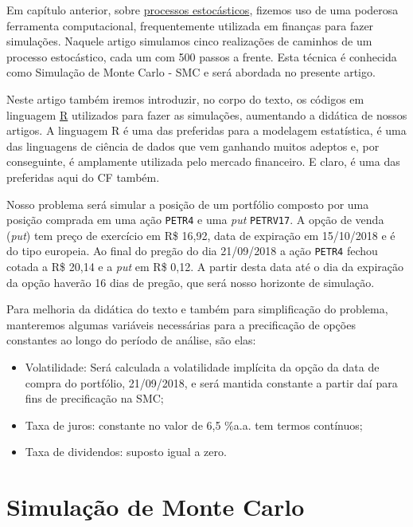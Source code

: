 \documentclass[]{book}
\theoremstyle{definition}
\theoremstyle{definition}
\theoremstyle{definition}
\theoremstyle{remark}
\begin{document}
Em capítulo anterior, sobre
\protect\hyperlink{processos-estocasticos}{processos estocásticos},
fizemos uso de uma poderosa ferramenta computacional, frequentemente
utilizada em finanças para fazer simulações. Naquele artigo simulamos
cinco realizações de caminhos de um processo estocástico, cada um com
500 passos a frente. Esta técnica é conhecida como Simulação de Monte
Carlo - SMC e será abordada no presente artigo.

Neste artigo também iremos introduzir, no corpo do texto, os códigos em
linguagem \href{https://cran.r-project.org/}{R} utilizados para fazer as
simulações, aumentando a didática de nossos artigos. A linguagem R é uma
das preferidas para a modelagem estatística, é uma das linguagens de
ciência de dados que vem ganhando muitos adeptos e, por conseguinte, é
amplamente utilizada pelo mercado financeiro. E claro, é uma das
preferidas aqui do CF também.

Nosso problema será simular a posição de um portfólio composto por uma
posição comprada em uma ação \texttt{PETR4} e uma \emph{put}
\texttt{PETRV17}. A opção de venda (\emph{put}) tem preço de exercício
em R\$ 16,92, data de expiração em 15/10/2018 e é do tipo europeia. Ao
final do pregão do dia 21/09/2018 a ação \texttt{PETR4} fechou cotada a
R\$ 20,14 e a \emph{put} em R\$ 0,12. A partir desta data até o dia da
expiração da opção haverão 16 dias de pregão, que será nosso horizonte
de simulação.

Para melhoria da didática do texto e também para simplificação do
problema, manteremos algumas variáveis necessárias para a precificação
de opções constantes ao longo do período de análise, são elas:

\begin{itemize}
\item
  Volatilidade: Será calculada a volatilidade implícita da opção da data
  de compra do portfólio, 21/09/2018, e será mantida constante a partir
  daí para fins de precificação na SMC;
\item
  Taxa de juros: constante no valor de 6,5 \%a.a. tem termos contínuos;
\item
  Taxa de dividendos: suposto igual a zero.
\end{itemize}

\section{Simulação de Monte Carlo}\label{simulacao-de-monte-carlo}
\end{document}
